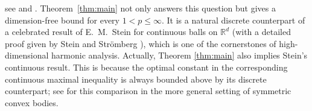\documentclass{article}
\newcommand{\R}{\mathbb R}
\theoremstyle{plain}
\numberwithin{equation}{section}
\begin{document}
see \cite[p.~903]{MirekSzarekWrobelSpheres} and \cite[p.~3]{MirekSzarekWrobelGaussians}. Theorem~\ref{thm:main} not only answers
this question but gives a dimension-free bound for every
\(1<p\leq\infty\). It is a natural discrete counterpart of a celebrated result of E.~M.~Stein for continuous balls on $\R^d$ \cite[Theorem~13, p.~374]{Stein1982} (with a detailed proof given by Stein and Str\"omberg \cite[Appendix, pp.~266--269]{SteinStromberg1983}), which is one of the cornerstones of high-dimensional harmonic analysis. Actually, Theorem \ref{thm:main} {also implies} Stein's continuous result. This is because the optimal constant in the corresponding continuous
maximal inequality is always {bounded above} by its discrete counterpart;
see \cite[Theorem~1]{KoszMirekPlewaWrobel} for this comparison in the more general
setting of symmetric convex bodies.
\end{document}
